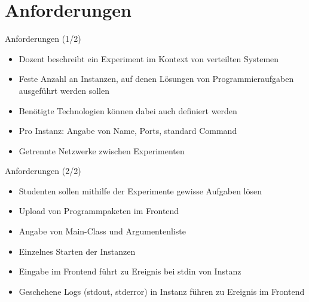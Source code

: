 \documentclass[compress]{beamer}
\begin{document}
\section{Anforderungen}
\begin{frame}{Anforderungen (1/2)}
  \begin{itemize}
    \item Dozent beschreibt ein Experiment im Kontext von verteilten Systemen
    \item Feste Anzahl an Instanzen, auf denen Lösungen von Programmieraufgaben ausgeführt werden sollen
    \item Benötigte Technologien können dabei auch definiert werden
    \item Pro Instanz: Angabe von Name, Ports, standard Command
    \item Getrennte Netzwerke zwischen Experimenten
  \end{itemize}
\end{frame}
\begin{frame}{Anforderungen (2/2)}
  \begin{itemize}
    \item Studenten sollen mithilfe der Experimente gewisse Aufgaben lösen
    \item Upload von Programmpaketen im Frontend
    \item Angabe von Main-Class und Argumentenliste
    \item Einzelnes Starten der Instanzen
    \item Eingabe im Frontend führt zu Ereignis bei stdin von Instanz
    \item Geschehene Logs (stdout, stderror) in Instanz führen zu Ereignis im Frontend
  \end{itemize}
\end{frame}
\end{document}
